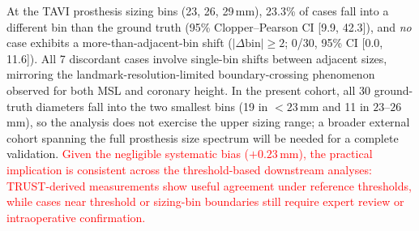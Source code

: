 \documentclass[conference]{IEEEtran}
\begin{document}
At the TAVI prosthesis sizing bins (23, 26, 29\,mm), 23.3\% of cases fall into a different bin than the ground truth (95\% Clopper--Pearson CI [9.9, 42.3]), and \emph{no} case exhibits a more-than-adjacent-bin shift ($|\Delta\text{bin}| \geq 2$; 0/30, 95\% CI [0.0, 11.6]). All 7 discordant cases involve single-bin shifts between adjacent sizes, mirroring the landmark-resolution-limited boundary-crossing phenomenon observed for both MSL and coronary height. In the present cohort, all 30 ground-truth diameters fall into the two smallest bins (19 in $<23$\,mm and 11 in $23$--$26$\,mm), so the analysis does not exercise the upper sizing range; a broader external cohort spanning the full prosthesis size spectrum will be needed for a complete validation. \textcolor{red}{Given the negligible systematic bias ($+0.23$\,mm), the practical implication is consistent across the threshold-based downstream analyses: TRUST-derived measurements show useful agreement under reference thresholds, while cases near threshold or sizing-bin boundaries still require expert review or intraoperative confirmation.}
\end{document}
